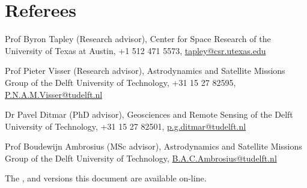 \documentclass[a4paper]{article}
\newcommand{\dynhref}[2]{%
  \iftoggle{expliciturl}{%
    #2 (\href{#1}{\texttt{\detokenize{#1}}})%
  }{%
    \href{#1}{#2}%
  }%
}
\renewenvironment{itemize}{
  \begin{list}{}{
    \setlength{\leftmargin}{1.5em}
  }
}{
  \end{list}
}
\newenvironment{cvtext}[1]{
  \vspace{0.15in}
  \section*{#1}
  \begin{minipage}{\textwidth}
  \setlength{\parindent}{10ex}
  \raggedright
}{
  \end{minipage}
}
\begin{document}

\begin{cvtext}{Referees}
\begin{itemize}
\item Prof Byron Tapley (Research advisor), Center for Space Research of the University of Texas at Austin, +1 512 471 5573, \href{mailto:tapley@csr.utexas.edu}{tapley@csr.utexas.edu}
\item Prof Pieter Visser (Research advisor), Astrodynamics and Satellite Missions Group of the Delft University of Technology, +31 15 27 82595, \href{mailto:P.N.A.M.Visser@tudelft.nl}{P.N.A.M.Visser@tudelft.nl}
\item Dr Pavel Ditmar (PhD advisor), Geosciences and Remote Sensing of the Delft University of Technology, +31 15 27 82501, \href{mailto:p.g.ditmar@tudelft.nl}{p.g.ditmar@tudelft.nl}
\item Prof Boudewijn Ambrosius (MSc advisor), Astrodynamics and Satellite Missions Group of the Delft University of Technology, \href{mailto:B.A.C.Ambrosius@tudelft.nl}{B.A.C.Ambrosius@tudelft.nl}
\end{itemize}
\end{cvtext}

\vfill
The \dynhref{http://jgte.github.io/cv/}{html}, \dynhref{http://jgte.github.io/cv/cv_jgte.pdf}{PDF} and \dynhref{http://jgte.github.io/cv/cv_jgte_print.pdf}{print-ready} versions this document are available on-line.
\end{document}
